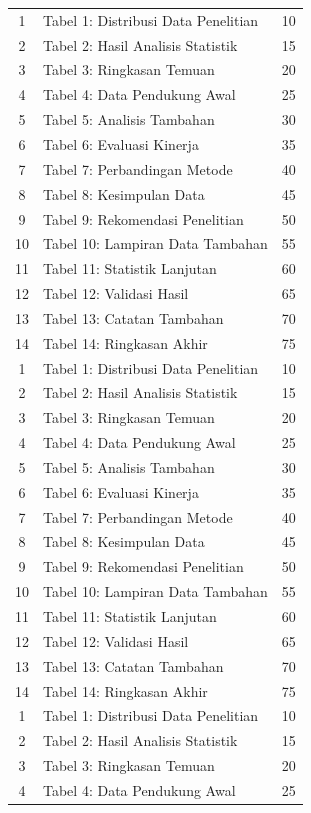 \begin{longtable}{c p{8cm} c}
		1 & Tabel 1: Distribusi Data Penelitian & 10 \\
	2 & Tabel 2: Hasil Analisis Statistik & 15 \\
	3 & Tabel 3: Ringkasan Temuan & 20 \\
	4 & Tabel 4: Data Pendukung Awal & 25 \\
	5 & Tabel 5: Analisis Tambahan & 30 \\
	6 & Tabel 6: Evaluasi Kinerja & 35 \\
	7 & Tabel 7: Perbandingan Metode & 40 \\
	8 & Tabel 8: Kesimpulan Data & 45 \\
	9 & Tabel 9: Rekomendasi Penelitian & 50 \\
	10 & Tabel 10: Lampiran Data Tambahan & 55 \\
	11 & Tabel 11: Statistik Lanjutan & 60 \\
	12 & Tabel 12: Validasi Hasil & 65 \\
	13 & Tabel 13: Catatan Tambahan & 70 \\
	14 & Tabel 14: Ringkasan Akhir & 75 \\
		1 & Tabel 1: Distribusi Data Penelitian & 10 \\
	2 & Tabel 2: Hasil Analisis Statistik & 15 \\
	3 & Tabel 3: Ringkasan Temuan & 20 \\
	4 & Tabel 4: Data Pendukung Awal & 25 \\
	5 & Tabel 5: Analisis Tambahan & 30 \\
	6 & Tabel 6: Evaluasi Kinerja & 35 \\
	7 & Tabel 7: Perbandingan Metode & 40 \\
	8 & Tabel 8: Kesimpulan Data & 45 \\
	9 & Tabel 9: Rekomendasi Penelitian & 50 \\
	10 & Tabel 10: Lampiran Data Tambahan & 55 \\
	11 & Tabel 11: Statistik Lanjutan & 60 \\
	12 & Tabel 12: Validasi Hasil & 65 \\
	13 & Tabel 13: Catatan Tambahan & 70 \\
	14 & Tabel 14: Ringkasan Akhir & 75 \\
		1 & Tabel 1: Distribusi Data Penelitian & 10 \\
	2 & Tabel 2: Hasil Analisis Statistik & 15 \\
	3 & Tabel 3: Ringkasan Temuan & 20 \\
	4 & Tabel 4: Data Pendukung Awal & 25 \\

\end{longtable}
